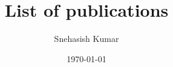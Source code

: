 \documentclass[11pt]{article}
\title{List of publications}
\author{Snehasish Kumar}
\date{\today}
\begin{document}
\maketitle %

\nocite{*}



\end{document}
